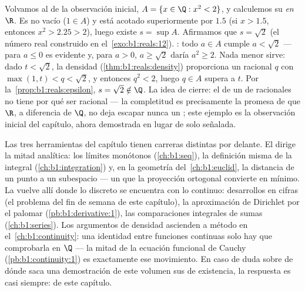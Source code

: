 \begin{example}\label{ex:b1:reals:supescape}
Volvamos al  de la observación inicial,
$A = \{x \in \Q : x^2 < 2\}$, y calculemos su  \emph{en $\R$}.
Es no vacío ($1 \in A$) y está acotado superiormente por $1.5$ (si
$x > 1.5$, entonces $x^2 > 2.25 > 2$), luego existe $s = \sup A$.
Afirmamos que $s = \sqrt 2$ (el número real construido en
el~\cref{exo:b1:reals:12}). : todo $a \in A$ cumple
$a < \sqrt2$ --- para $a \leq 0$ es evidente y, para $a > 0$,
$a \geq \sqrt2$ daría $a^2 \geq 2$. Nada menor sirve: dado
$t < \sqrt2$, la densidad (\cref{thm:b1:reals:density}) proporciona un
racional $q$ con $\max(1, t) < q < \sqrt 2$, y entonces $q^2 < 2$,
luego $q \in A$ supera a $t$. Por la~\cref{prop:b1:reals:epsilon},
$s = \sqrt2 \notin \Q$. La idea de cierre: el  de un 
de racionales no tiene por qué ser racional --- la completitud es
precisamente la promesa de que $\R$, a diferencia de $\Q$, no deja
escapar nunca un ; este ejemplo es la observación inicial del
capítulo, ahora demostrada en lugar de solo señalada.
\end{example}

\begin{remark}
Las tres herramientas del capítulo tienen carreras distintas por
delante. El  dirige la mitad analítica: los límites monótonos
(\cref{ch:b1:seq}), la definición misma de la integral
(\cref{ch:b1:integration}) y, en la geometría del~\cref{ch:b1:euclid},
la distancia de un punto a un subespacio --- un  que la
proyección ortogonal convierte en mínimo. La  vuelve allí
donde lo discreto se encuentra con lo continuo: desarrollos en cifras
(el problema del fin de semana de este capítulo), la aproximación de
Dirichlet por el palomar (\cref{pb:b1:derivative:1}), las
comparaciones integrales de sumas (\cref{ch:b1:series}). Los
argumentos de densidad ascienden a método en
el~\cref{ch:b1:continuity}: una identidad entre funciones continuas
solo hay que comprobarla en $\Q$ --- la mitad de la ecuación funcional
de Cauchy (\cref{pb:b1:continuity:1}) es exactamente ese movimiento.
En caso de duda sobre de dónde saca una demostración de este volumen
sus  de existencia, la respuesta es casi siempre: de este
capítulo.
\end{remark}

